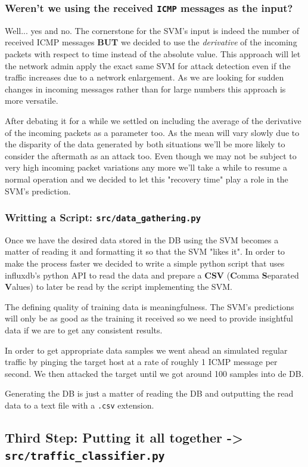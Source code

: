 \documentclass[12pt]{report}
\newcommand{\newpar} {
    \vskip 1cm
}
\begin{document}
			\subsubsection{Weren't we using the received \texttt{ICMP} messages as the input?}
				Well... yes and no. The cornerstone for the SVM's input is indeed the number of received ICMP messages \textbf{BUT} we decided to use the \textit{derivative} of the incoming packets with respect to time instead of the absolute value. This approach will let the network admin apply the exact same SVM for attack detection even if the traffic increases due to a network enlargement. As we are looking for sudden changes in incoming messages rather than for large numbers this approach is more versatile.
				\newpar
				After debating it for a while we settled on including the average of the derivative of the incoming packets as a parameter too. As the mean will vary slowly due to the disparity of the data generated by both situations we'll be more likely to consider the aftermath as an attack too. Even though we may not be subject to very high incoming packet variations any more we'll take a while to resume a normal operation and we decided to let this "recovery time" play a role in the SVM's prediction.

			\subsubsection{Writting a Script: \texttt{src/data\_gathering.py}}
				Once we have the desired data stored in the DB using the SVM becomes a matter of reading it and formatting it so that the SVM "likes it". In order to make the process faster we decided to write a simple python script that uses influxdb's python API to read the data and prepare a \textbf{CSV} (\textbf{C}omma \textbf{S}eparated \textbf{V}alues) to later be read by the script implementing the SVM.
				\newpar
				The defining quality of training data is meaningfulness. The SVM's predictions will only be as good as the training it received so we need to provide insightful data if we are to get any consistent results.
				\newpar
				In order to get appropriate data samples we went ahead an simulated regular traffic by pinging the target host at a rate of roughly 1 ICMP message per second. We then attacked the target until we got around 100 samples into de DB.
				\newpar
				Generating the DB is just a matter of reading the DB and outputting the read data to a text file with a \texttt{.csv} extension.

		\subsection{Third Step: Putting it all together -> \texttt{src/traffic\_classifier.py}}
\end{document}
